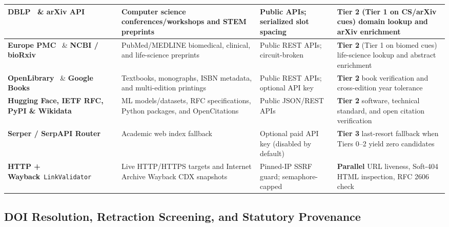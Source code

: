 {\begin{longtable}{|L{0.23}|L{0.29}|L{0.21}|L{0.27}|}
\hline
\textbf{DBLP}~\cite{dblp} \& \textbf{arXiv API}~\cite{arxiv-api} & Computer science conferences/workshops and STEM preprints & Public APIs; serialized slot spacing & \textbf{Tier 2} (Tier 1 on CS/arXiv cues) domain lookup and arXiv enrichment \\
\hline
\textbf{Europe PMC}~\cite{europepmc} \& \textbf{NCBI / bioRxiv} & PubMed/MEDLINE biomedical, clinical, and life-science preprints & Public REST APIs; circuit-broken & \textbf{Tier 2} (Tier 1 on biomed cues) life-science lookup and abstract enrichment \\
\hline
\textbf{OpenLibrary}~\cite{openlibrary} \& \textbf{Google Books} & Textbooks, monographs, ISBN metadata, and multi-edition printings & Public REST APIs; optional API key & \textbf{Tier 2} book verification and cross-edition year tolerance \\
\hline
\textbf{Hugging Face, IETF RFC, PyPI \& Wikidata} & ML models/datasets, RFC specifications, Python packages, and OpenCitations & Public JSON/REST APIs & \textbf{Tier 2} software, technical standard, and open citation verification \\
\hline
\textbf{Serper / SerpAPI Router} & Academic web index fallback & Optional paid API key (disabled by default) & \textbf{Tier 3} last-resort fallback when Tiers 0--2 yield zero candidates \\
\hline
\textbf{HTTP + Wayback}~\cite{wayback-cdx}\newline\texttt{LinkValidator} & Live HTTP/HTTPS targets and Internet Archive Wayback CDX snapshots & Pinned-IP SSRF guard; semaphore-capped & \textbf{Parallel} URL liveness, Soft-404 HTML inspection, RFC 2606~\cite{rfc2606} check \\
\hline
\end{longtable}
}

\subsection{DOI Resolution, Retraction Screening, and Statutory Provenance}

